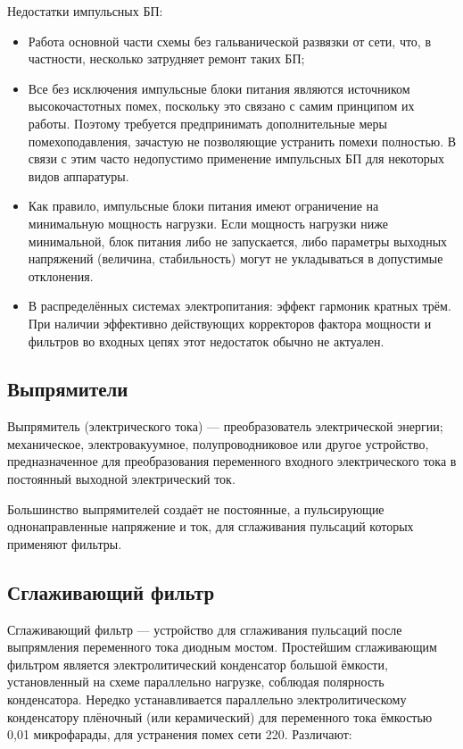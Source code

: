 \documentclass[unicode, 12pt, a4paper, oneside]{article}
\begin{document}
Недостатки импульсных БП:

\begin{itemize}
\item Работа основной части схемы без гальванической развязки от сети, что, в частности, несколько затрудняет ремонт таких БП;
\item Все без исключения импульсные блоки питания являются источником высокочастотных помех, поскольку это связано с самим принципом их работы. Поэтому требуется предпринимать дополнительные меры помехоподавления, зачастую не позволяющие устранить помехи полностью. В связи с этим часто недопустимо применение импульсных БП для некоторых видов аппаратуры.
\item Как правило, импульсные блоки питания имеют ограничение на минимальную мощность нагрузки. Если мощность нагрузки ниже минимальной, блок питания либо не запускается, либо параметры выходных напряжений (величина, стабильность) могут не укладываться в допустимые отклонения.
\item В распределённых системах электропитания: эффект гармоник кратных трём. При наличии эффективно действующих корректоров фактора мощности и фильтров во входных цепях этот недостаток обычно не актуален.
\end{itemize}

\subsection*{Выпрямители}

Выпрямитель (электрического тока) — преобразователь электрической энергии; механическое, электровакуумное, полупроводниковое или другое устройство, предназначенное для преобразования переменного входного электрического тока в постоянный выходной электрический ток.

Большинство выпрямителей создаёт не постоянные, а пульсирующие однонаправленные напряжение и ток, для сглаживания пульсаций которых применяют фильтры.

\subsection*{Сглаживающий фильтр}

Сглаживающий фильтр — устройство для сглаживания пульсаций после выпрямления переменного тока диодным мостом. Простейшим сглаживающим фильтром является электролитический конденсатор большой ёмкости, установленный на схеме параллельно нагрузке, соблюдая полярность конденсатора. Нередко устанавливается параллельно электролитическому конденсатору плёночный (или керамический) для переменного тока ёмкостью 0,01 микрофарады, для устранения помех сети 220. Различают:
\end{document}
